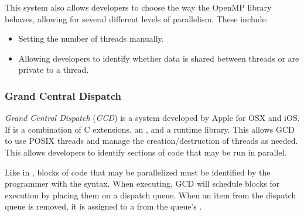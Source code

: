 This system also allows developers to choose the way the OpenMP library behaves, allowing for several different levels of parallelism.
These include:
\begin{itemize}[noitemsep]
\item Setting the number of threads manually.
\item Allowing developers to identify whether data is shared between threads or are private to a thread.
\end{itemize}

\subsubsection{Grand Central Dispatch}\label{subsubsec:Grand_Central_Dispatch}
\emph{Grand Central Dispatch} (\emph{GCD}) is a  system developed by Apple for OSX and iOS.\@
If is a combination of C extensions, an , and a runtime library.
This allows GCD to use POSIX threads and manage the creation/destruction of threads as needed.
This allows developers to identify sections of code that may be run in parallel.

Like in , blocks of code that may be parallelized must be identified by the programmer with the  syntax.
When executing, GCD will schedule blocks for execution by placing them on a dispatch queue.
When an item from the dispatch queue is removed, it is assigned to a  from the queue's .

